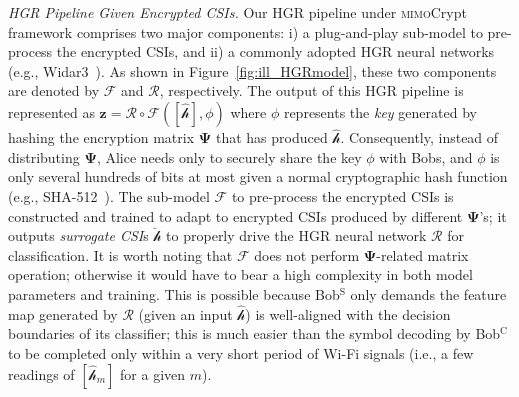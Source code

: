 \documentclass[conference,compsoc]{IEEEtran}
\newcommand{\sname}{\textsc{mimo}Crypt\xspace}
\newcommand{\rev}[1]{{\color{blue}#1}}      %
\newcommand{\rev}[1]{#1}
\begin{document}
\vspace{.5ex}
\emph{HGR Pipeline Given Encrypted CSIs.}
%
Our HGR pipeline under \sname framework comprises two major components: i) a plug-and-play sub-model to pre-process the encrypted CSIs, and ii) a commonly adopted HGR neural networks (e.g., Widar3~\cite{Widar3-MobiSys19}). As shown in Figure~\ref{fig:ill_HGRmodel}, these two components are denoted by $\mathcal{F}$ and $\mathcal{R}$, respectively. The output of this HGR pipeline is represented as \rev{$\bm{z} = \mathcal{R} \circ \mathcal{F}  ( [\hat{\bm{\mathcal{h}}}], \phi ) $} where 
$\phi$ represents the \textit{key} generated by hashing the \rev{encryption} matrix $\bm{\Psi}$ that has produced \rev{$\hat{\bm{\mathcal{h}}}$}. Consequently, instead of distributing $\bm{\Psi}$, Alice needs only to securely share the key $\phi$ with Bobs, and $\phi$ is only several hundreds of bits at most given a normal cryptographic hash function (e.g., SHA-512~\cite{SHA}). 
The sub-model $\mathcal{F}$ to pre-process the \rev{encrypted} CSIs is constructed and trained to adapt to \rev{encrypted} CSIs produced by different $\bm{\Psi}$'s; it outputs \textit{surrogate CSI}s \rev{$\breve{\bm{\mathcal{h}}}$} to properly drive the HGR neural network $\mathcal{R}$ for classification. It is worth noting that $\mathcal{F}$ does not perform $\bm{\Psi}$-related matrix operation; 
otherwise it would have to bear a high complexity in both model parameters and training. This is possible because Bob$^{\mathrm{S}}$ only demands the feature map generated by $\mathcal{R}$ (given an input $\hat{\bm{\mathcal{h}}}$) is well-aligned with the decision boundaries of its classifier; this is much easier than the symbol decoding by Bob$^{\mathrm{C}}$ to be completed only within a very short period of Wi-Fi signals (i.e., \rev{a few readings of $[\hat{\mathcal{h}}_{m}]$ for a given $m$}). %
\end{document}
